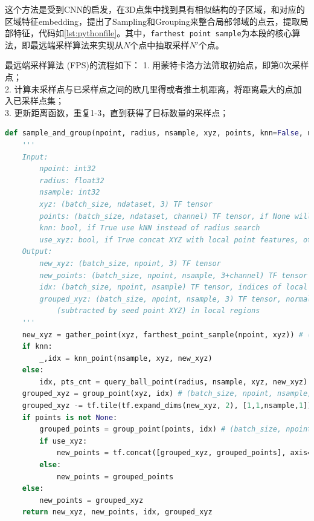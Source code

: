 这个方法是受到CNN的启发，在3D点集中找到具有相似结构的子区域，和对应的区域特征embedding，提出了Sampling和Grouping来整合局部邻域的点云，提取局部特征，代码如\ref{lst:pythonfile}。其中，\texttt{farthest point sample}为本段的核心算法，即最远端采样算法来实现从$N$个点中抽取采样$N'$个点。

最远端采样算法 (FPS)的流程如下：
1. 用蒙特卡洛方法筛取初始点，即第0次采样点； \\
2. 计算未采样点与已采样点之间的欧几里得或者推土机距离，将距离最大的点加入已采样点集； \\
3. 更新距离函数，重复1-3，直到获得了目标数量的采样点； \\

\begin{lstlisting}[language=Python, caption={最远端采样算法}, label={lst:pythonfile}]
    def sample_and_group(npoint, radius, nsample, xyz, points, knn=False, use_xyz=True):
    '''
    Input:
        npoint: int32
        radius: float32
        nsample: int32
        xyz: (batch_size, ndataset, 3) TF tensor
        points: (batch_size, ndataset, channel) TF tensor, if None will just use xyz as points
        knn: bool, if True use kNN instead of radius search
        use_xyz: bool, if True concat XYZ with local point features, otherwise just use point features
    Output:
        new_xyz: (batch_size, npoint, 3) TF tensor
        new_points: (batch_size, npoint, nsample, 3+channel) TF tensor
        idx: (batch_size, npoint, nsample) TF tensor, indices of local points as in ndataset points
        grouped_xyz: (batch_size, npoint, nsample, 3) TF tensor, normalized point XYZs
            (subtracted by seed point XYZ) in local regions
    '''
    new_xyz = gather_point(xyz, farthest_point_sample(npoint, xyz)) # (batch_size, npoint, 3)
    if knn:
        _,idx = knn_point(nsample, xyz, new_xyz)
    else:
        idx, pts_cnt = query_ball_point(radius, nsample, xyz, new_xyz)
    grouped_xyz = group_point(xyz, idx) # (batch_size, npoint, nsample, 3)
    grouped_xyz -= tf.tile(tf.expand_dims(new_xyz, 2), [1,1,nsample,1]) # translation normalization
    if points is not None:
        grouped_points = group_point(points, idx) # (batch_size, npoint, nsample, channel)
        if use_xyz:
            new_points = tf.concat([grouped_xyz, grouped_points], axis=-1) # (batch_size, npoint, nample, 3+channel)
        else:
            new_points = grouped_points
    else:
        new_points = grouped_xyz
    return new_xyz, new_points, idx, grouped_xyz
\end{lstlisting}

